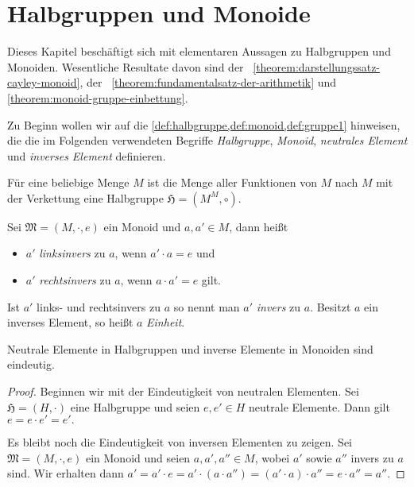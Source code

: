 \section{Halbgruppen und Monoide}
Dieses Kapitel beschäftigt sich mit elementaren Aussagen zu Halbgruppen und Monoiden. Wesentliche Resultate davon sind der ~\ref{theorem:darstellungssatz-cayley-monoid}, der ~\ref{theorem:fundamentalsatz-der-arithmetik} und \cref{theorem:monoid-gruppe-einbettung}.

Zu Beginn wollen wir auf die \cref{def:halbgruppe,def:monoid,def:gruppe1} hinweisen, die die im Folgenden verwendeten Begriffe \emph{Halbgruppe}, \emph{Monoid}, \emph{neutrales Element} und \emph{inverses Element} definieren.

\begin{example}
    Für eine beliebige Menge $M$ ist die Menge aller Funktionen von $M$ nach $M$ mit der Verkettung eine Halbgruppe $\mathfrak{H} = (M^M, \circ)$.
\end{example}

\begin{definition}
    Sei $\mathfrak{M} = (M, \cdot, e)$ ein Monoid und $a, a' \in M$, dann heißt
    \begin{itemize}
        \item $a'$ \emph{linksinvers} zu $a$, wenn $a' \cdot a = e$ und
        \item $a'$ \emph{rechtsinvers} zu $a$, wenn $a \cdot a' = e$ gilt.
    \end{itemize}
    Ist $a'$ links- und rechtsinvers zu $a$ so nennt man $a'$ \emph{invers} zu $a$. Besitzt $a$ ein inverses Element, so heißt $a$ \emph{Einheit}.
\end{definition}

\begin{lemma}
    Neutrale Elemente in Halbgruppen und inverse Elemente in Monoiden sind eindeutig.
\end{lemma}

\begin{proof}
    Beginnen wir mit der Eindeutigkeit von neutralen Elementen. Sei $\mathfrak{H} = (H, \cdot)$ eine Halbgruppe und seien $e, e' \in H$ neutrale Elemente. Dann gilt $e = e \cdot e' = e'.$
    
    Es bleibt noch die Eindeutigkeit von inversen Elementen zu zeigen. Sei $\mathfrak{M} = (M, \cdot, e)$ ein Monoid und seien $a, a', a'' \in M$, wobei $a'$ sowie $a''$ invers zu $a$ sind. Wir erhalten dann $ a' = a' \cdot e = a' \cdot (a \cdot a'') = (a' \cdot a) \cdot a'' = e \cdot a'' = a''.$
\end{proof}

